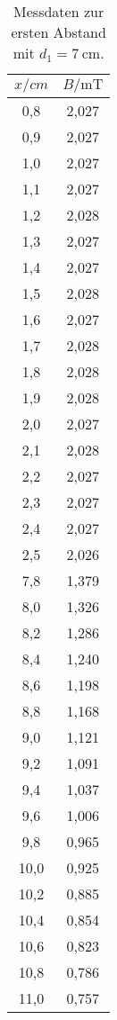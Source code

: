 \begin{table}[htbp]
	\centering
	\caption{Messdaten zur ersten Abstand mit $d_{1} = \SI{7}{\cm}$.}
	\label{tab:ErsterAbstand}
	\begin{tabular}{c c}
		\toprule
		$x / \si{cm} $ & $ B / \si{\milli\tesla}$ \\
		\midrule
	     0,8 &	2,027 \\
	     0,9 &	2,027 \\
	     1,0 &  2,027 \\
	     1,1 &	2,027 \\
	     1,2 &	2,028 \\
	     1,3 &	2,027 \\
	     1,4 &	2,027 \\
	     1,5 &	2,028 \\
	     1,6 &	2,027 \\
	     1,7 &	2,028 \\
	     1,8 &	2,028 \\
	     1,9 &	2,028 \\
	     2,0 &  2,027 \\
	     2,1 &	2,028 \\
	     2,2 &	2,027 \\
	     2,3 &	2,027 \\
	     2,4 &	2,027 \\
	     2,5 &	2,026 \\
	     \midrule
	     7,8  &	1,379 \\
	     8,0  & 1,326 \\
	     8,2  &	1,286 \\
	     8,4  &	1,240 \\
	     8,6  &	1,198 \\
	     8,8  &	1,168 \\
	     9,0  & 1,121 \\
	     9,2  &	1,091 \\
	     9,4  &	1,037 \\
	     9,6  &	1,006 \\
	     9,8  &	0,965 \\
	     10,0 & 0,925 \\
	     10,2 &	0,885 \\
	     10,4 &	0,854 \\
	     10,6 &	0,823 \\
	     10,8 &	0,786 \\
	     11,0 & 0,757 \\
		\bottomrule
	\end{tabular}
\end{table}


